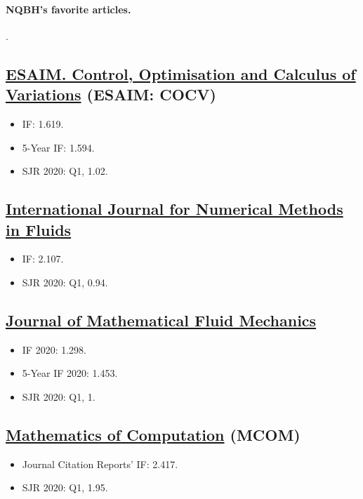 \documentclass{article}
\numberwithin{equation}{section}
\begin{document}
\paragraph{NQBH's favorite articles.} \cite{Tao2013}.

\subsection{\href{https://www.esaim-cocv.org/}{ESAIM. Control, Optimisation and Calculus of Variations} (ESAIM: COCV)}
\begin{itemize}
	\item IF: 1.619.
	\item 5-Year IF: 1.594.
	\item SJR 2020: Q1, 1.02.
\end{itemize}

\subsection{\href{https://onlinelibrary.wiley.com/journal/10970363}{International Journal for Numerical Methods in Fluids}}
\begin{itemize}
	\item IF: 2.107.
	\item SJR 2020: Q1, 0.94.
\end{itemize}

\subsection{\href{https://www.springer.com/journal/21}{Journal of Mathematical Fluid Mechanics}}
\begin{itemize}
	\item IF 2020: 1.298.
	\item 5-Year IF 2020: 1.453.
	\item SJR 2020: Q1, 1.
\end{itemize}

\subsection{\href{https://www.ams.org/publications/journals/journalsframework/mcom}{Mathematics of Computation} (MCOM)}
\begin{itemize}
	\item Journal Citation Reports' IF: 2.417.
	\item SJR 2020: Q1, 1.95.
\end{itemize}
\end{document}
